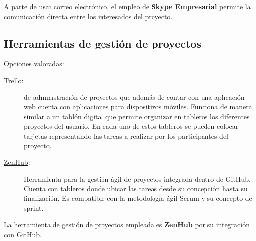 A parte de usar correo electrónico, el empleo de \textbf{Skype Empresarial}
permite la comunicación directa entre los interesados del proyecto.

\subsection{Herramientas de gestión de proyectos}
Opciones valoradas:
\begin{description}
  \item[\href{https://trello.com/}{Trello}:]  de
  administración de proyectos que además de contar con una aplicación web cuenta
  con aplicaciones para dispositivos móviles. Funciona de manera similar a un
  tablón digital que permite organizar en tableros los diferentes proyectos del
  usuario. En cada uno de estos tableros se pueden colocar tarjetas
  representando las tareas a realizar por los participantes del proyecto.
  \item[\href{https://www.zenhub.com/}{ZenHub}:] Herramienta para la gestión
  ágil de proyectos integrada dentro de GitHub. Cuenta con tableros donde ubicar
  las tareas desde su concepción hasta su finalización. Es compatible con la
  metodología ágil Scrum y su concepto de sprint.
\end{description}

La herramienta de gestión de proyectos empleada es \textbf{ZenHub} por su
integración con GitHub.

